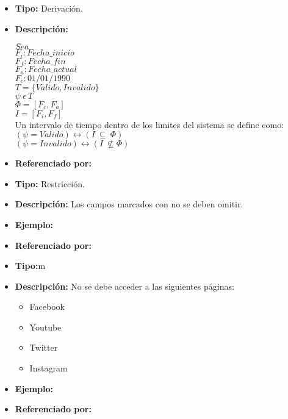\begin{itemize}
  \item \textbf{Tipo:} Derivación. 
  \item \textbf{Descripción:} 

  $Sea$\\

  $F_i:Fecha\_inicio$\\
  $F_f:Fecha\_fin$\\
  $F_a:Fecha\_actual$\\
  $F_c:01/01/1990$\\

  $T=\{Valido,Invalido\}$\\
  $\psi\ \epsilon\ T$\\

  $\Phi=[F_c,F_a]$\\
  $I=[F_i,F_f]$\\
  

  Un intervalo de tiempo dentro de los limites del sistema se define como:\\

  $(\psi=Valido)\leftrightarrow(I\ \subseteq\ \Phi)$\\
  $(\psi=Invalido)\leftrightarrow(I\ \nsubseteq \Phi)$\\

  \item \textbf{Referenciado por:}  \\
\end{itemize}


\begin{itemize}
  \item \textbf{Tipo:} Restricción.  
  \item \textbf{Descripción:} Los campos marcados con \* no se deben omitir.
  \item \textbf{Ejemplo:} 
  \item \textbf{Referenciado por:}  \\
\end{itemize}

\begin{itemize}
  \item \textbf{Tipo:}m
  \item \textbf{Descripción:} No se debe acceder a las siguientes páginas:
    \begin{itemize}
        \item Facebook
        \item Youtube
        \item Twitter
        \item Instagram 
    \end{itemize} 
  \item \textbf{Ejemplo:}
  \item \textbf{Referenciado por:}  \\
\end{itemize}

